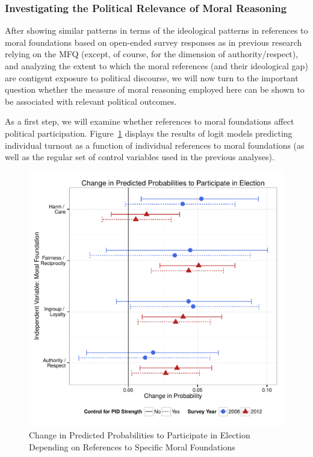 \documentclass[12pt]{article}
\begin{document}
\subsubsection{Investigating the Political Relevance of Moral Reasoning}

After showing similar patterns in terms of the ideological patterns in references to moral foundations based on open-ended survey responses as in previous research relying on the MFQ (except, of course, for the dimension of authority/respect), and analyzing the extent to which the moral references (and their ideological gap) are contigent exposure to political discourse, we will now turn to the important question whether the measure of moral reasoning employed here can be shown to be associated with relevant political outcomes.

As a first step, we will examine whether references to moral foundations affect political participation. Figure~\ref{fig:m2b_vote} displays the results of logit models predicting individual turnout as a function of individual references to moral foundations (as well as the regular set of control variables used in the previous analyses).

\begin{figure}[ht]\centering
\includegraphics[scale=.5]{../calc/fig/m2b_vote.pdf}
\caption{Change in Predicted Probabilities to Participate in Election Depending on References to Specific Moral Foundations}\label{fig:m2b_vote}
\end{figure}
\end{document}
